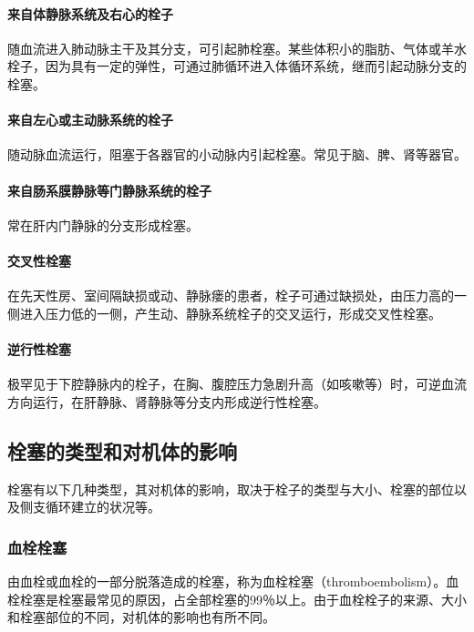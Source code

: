 \paragraph{来自体静脉系统及右心的栓子}
随血流进入肺动脉主干及其分支，可引起肺栓塞。某些体积小的脂肪、气体或羊水栓子，因为具有一定的弹性，可通过肺循环进入体循环系统，继而引起动脉分支的栓塞。

\paragraph{来自左心或主动脉系统的栓子}
随动脉血流运行，阻塞于各器官的小动脉内引起栓塞。常见于脑、脾、肾等器官。

\paragraph{来自肠系膜静脉等门静脉系统的栓子}
常在肝内门静脉的分支形成栓塞。

\paragraph{交叉性栓塞}
在先天性房、室间隔缺损或动、静脉瘘的患者，栓子可通过缺损处，由压力高的一侧进入压力低的一侧，产生动、静脉系统栓子的交叉运行，形成交叉性栓塞。

\paragraph{逆行性栓塞}
极罕见于下腔静脉内的栓子，在胸、腹腔压力急剧升高（如咳嗽等）时，可逆血流方向运行，在肝静脉、肾静脉等分支内形成逆行性栓塞。

\subsection{栓塞的类型和对机体的影响}

栓塞有以下几种类型，其对机体的影响，取决于栓子的类型与大小、栓塞的部位以及侧支循环建立的状况等。

\subsubsection{血栓栓塞}

由血栓或血栓的一部分脱落造成的栓塞，称为血栓栓塞（thromboembolism）。血栓栓塞是栓塞最常见的原因，占全部栓塞的99％以上。由于血栓栓子的来源、大小和栓塞部位的不同，对机体的影响也有所不同。

